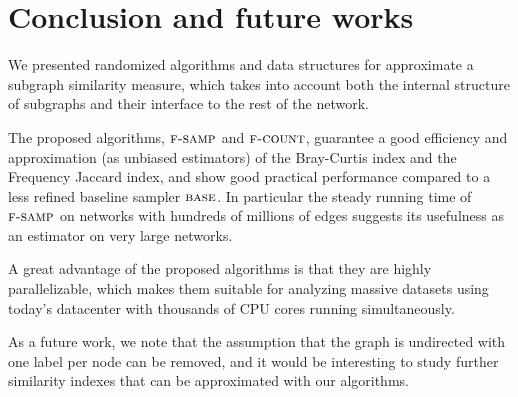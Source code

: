 \chapter{Conclusion and future works}
    
We presented randomized algorithms and data structures for approximate a subgraph similarity measure, which takes into account both the internal structure of subgraphs and their interface to the rest of the network. \medskip

The proposed algorithms, $\textsc{f-samp}$ and $\textsc{f-count}$, guarantee a good efficiency and approximation (as unbiased estimators) of the Bray-Curtis index and the Frequency Jaccard index, and show good practical performance compared to a less refined baseline sampler $\textsc{base}$. In particular the steady running time of $\textsc{f-samp}$ on networks with hundreds of millions of edges suggests its usefulness as an estimator on very large networks.\medskip

A great advantage of the proposed algorithms is that they are highly parallelizable, which makes them suitable for analyzing massive datasets using today's datacenter with thousands of CPU cores running simultaneously.\medskip

As a future work, we note that the assumption that the graph is undirected with one label per node can be removed, and it would be interesting to study further similarity indexes that can be approximated with our algorithms.

\noindent

\clearpage

